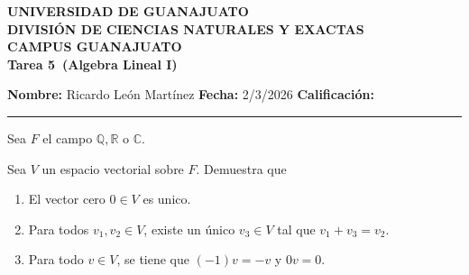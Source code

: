 \documentclass[12pt,a4paper]{article}
\newcommand{\alumno}{Ricardo León Martínez}
\newcommand{\materia}{Algebra Lineal I}
\newcommand{\tarea}{Tarea 5}
\newcommand{\fecha}{2/3/2026}
\begin{document}
    \begin{center}
        {\large\textbf{UNIVERSIDAD DE GUANAJUATO}}\\[0.3cm]
        {\normalsize\textbf{DIVISIÓN DE CIENCIAS NATURALES Y EXACTAS}}\\
        {\normalsize\textbf{CAMPUS GUANAJUATO}}\\[1cm]

        {\Large\textbf{\tarea\ (\materia)}}\\[1cm]
    \end{center}

    \noindent
    \textbf{Nombre:} \alumno 
    \hfill 
    \textbf{Fecha:} \fecha 
    \hfill 
    \textbf{Calificación:} \rule{3cm}{0.4pt}

    \vspace{0.3cm}

    Sea $F$ el campo $\mathbb{Q},\mathbb{R}$ o $\mathbb{C}$.

    \begin{mdframed}[style=mdbluebox,frametitle={Ejercicio 1}]
        Sea $V$ un espacio vectorial sobre $F$. Demuestra que
        \begin{enumerate}
            \item[(a)] El vector cero $0\in V$ es unico.
            \item[(b)] Para todos $v_{1},v_{2}\in V$, existe un único $v_{3}\in V$ tal que
            $v_{1}+v_{3}=v_{2}$.
            \item[(c)] Para todo $v\in V$, se tiene que $(-1)v=-v$ y $0v=0$. 
        \end{enumerate}
    \end{mdframed}
\end{document}
